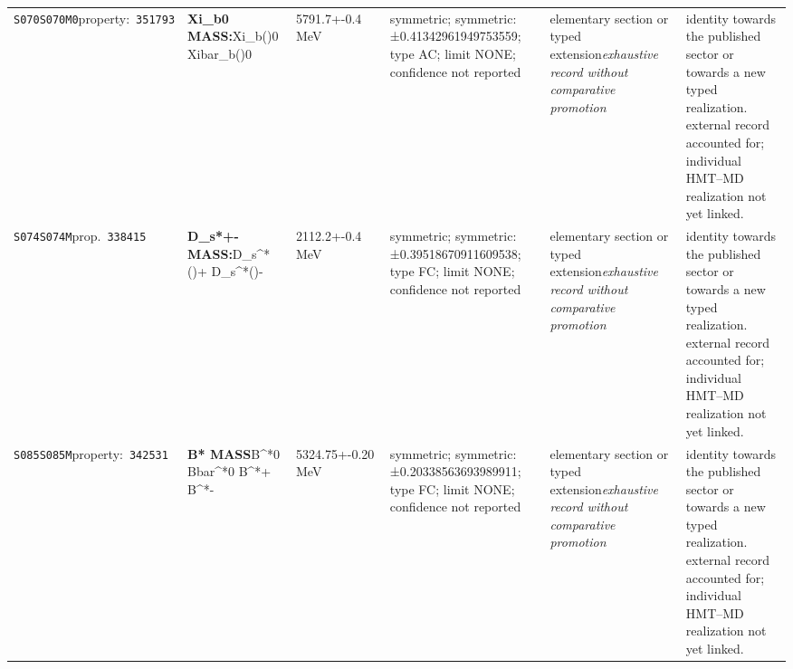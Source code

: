 \begin{landscape}
\begin{longtable}{L{1.85cm}L{4.45cm}L{2.35cm}L{4.05cm}L{3.35cm}L{7.15cm}}
\texttt{S070}\newline \texttt{S070M0}\newline property:\ \texttt{351793} & \textbf{Xi\_\allowbreak{}b0 MASS:}\newline Xi\_\allowbreak{}b()0 \textbar{}\allowbreak{} Xibar\_\allowbreak{}b()0 & 5791.7+-0.4\,MeV & symmetric; symmetric: ±0.41342961949753559; type AC; limit NONE; confidence not reported & elementary section or typed extension\newline \emph{exhaustive record without comparative promotion} & identity towards the published sector or towards a new typed realization. external record accounted for; individual HMT--MD realization not yet linked. \\
\texttt{S074}\newline \texttt{S074M}\newline prop.\ \texttt{338415} & \textbf{D\_\allowbreak{}s*+- MASS:}\newline D\_\allowbreak{}s\textasciicircum{}*()+ \textbar{}\allowbreak{} D\_\allowbreak{}s\textasciicircum{}*()- & 2112.2+-0.4\,MeV & symmetric; symmetric: ±0.39518670911609538; type FC; limit NONE; confidence not reported & elementary section or typed extension\newline \emph{exhaustive record without comparative promotion} & identity towards the published sector or towards a new typed realization. external record accounted for; individual HMT--MD realization not yet linked. \\
\texttt{S085}\newline \texttt{S085M}\newline property:\ \texttt{342531} & \textbf{B* MASS}\newline B\textasciicircum{}*0 \textbar{}\allowbreak{} Bbar\textasciicircum{}*0 \textbar{}\allowbreak{} B\textasciicircum{}*+ \textbar{}\allowbreak{} B\textasciicircum{}*- & 5324.75+-0.20\,MeV & symmetric; symmetric: ±0.20338563693989911; type FC; limit NONE; confidence not reported & elementary section or typed extension\newline \emph{exhaustive record without comparative promotion} & identity towards the published sector or towards a new typed realization. external record accounted for; individual HMT--MD realization not yet linked. \\

\end{longtable}
\end{landscape}
